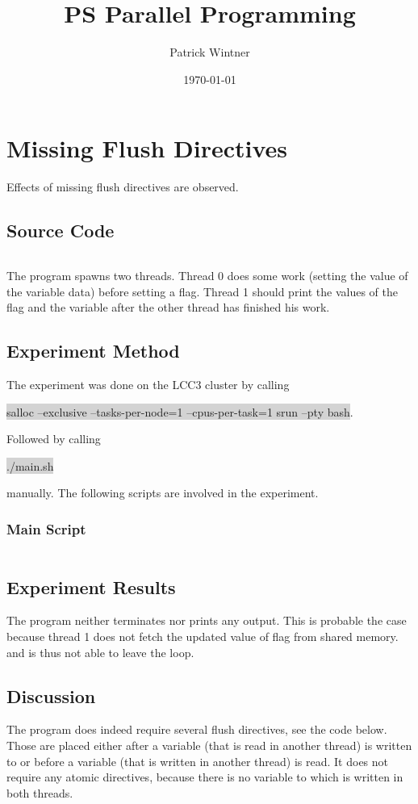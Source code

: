 \documentclass[parskip]{scrartcl}
\title{PS Parallel Programming}
\author{Patrick Wintner}
\date{\today}
\begin{document}
	\maketitle
	
	\section{Missing Flush Directives}
	Effects of missing flush directives are observed.
	\subsection{Source Code}
	\inputminted	[linenos]{c}{ex1/ex1.c}
	
	The program spawns two threads. Thread 0 does some  work (setting the value of the variable data) before setting a flag. Thread 1 should print the values of the flag and the variable after the other thread has finished his work.
	
	\subsection{Experiment Method}
	The experiment was done on the LCC3 cluster by calling 
	\begin{center}
		\colorbox{lightgray}{salloc --exclusive --tasks-per-node=1 --cpus-per-task=1 srun --pty bash}.
	\end{center} 
	Followed by calling 
	\begin{center}
		\colorbox{lightgray}{./main.sh}
	\end{center}		
	manually. The following scripts are involved in the experiment.
	\subsubsection{Main Script}
	\inputminted[linenos]{bash}{ex1/main.sh}
	
	\subsection{Experiment Results}
	The program neither terminates nor prints any output. This is probable the case because thread 1 does not fetch the updated value of flag from shared memory.  and is thus not able to leave the loop.
	
	\subsection{Discussion}
	The program does indeed require several flush directives, see the code below. Those are placed either after a variable (that is read in another thread) is written to or before a variable (that is written in another thread) is read. It does not require any atomic directives, because there is no variable to which is written in both threads.
	
\end{document}
